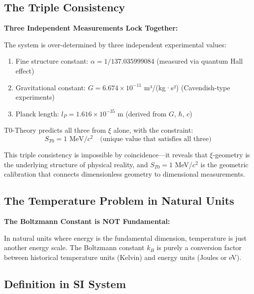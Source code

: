 \documentclass[12pt,a4paper]{article}
\begin{document}
	\subsection{The Triple Consistency}
	
	\begin{insight}
		\textbf{Three Independent Measurements Lock Together:}
		
		The system is over-determined by three independent experimental values:
		\begin{enumerate}
			\item Fine structure constant: $\alpha = 1/137.035999084$ (measured via quantum Hall effect)
			\item Gravitational constant: $G = 6.674 \times 10^{-11}$ m³/(kg·s²) (Cavendish-type experiments)
			\item Planck length: $l_P = 1.616 \times 10^{-35}$ m (derived from $G$, $\hbar$, $c$)
		\end{enumerate}
		
		T0-Theory predicts all three from $\xi$ alone, with the constraint:
		\begin{equation}
			S_{T0} = 1 \text{ MeV}/c^2 \quad \text{(unique value that satisfies all three)}
		\end{equation}
		
		This triple consistency is impossible by coincidence—it reveals that $\xi$-geometry is the underlying structure of physical reality, and $S_{T0} = 1$ MeV/$c^2$ is the geometric calibration that connects dimensionless geometry to dimensional measurements.
	\end{insight}
	
	\subsection{The Temperature Problem in Natural Units}
	
	\begin{warning}
		\textbf{The Boltzmann Constant is NOT Fundamental:}
		
		In natural units where energy is the fundamental dimension, temperature is just another energy scale. The Boltzmann constant $k_B$ is purely a conversion factor between historical temperature units (Kelvin) and energy units (Joules or eV).
	\end{warning}
	
	\subsection{Definition in SI System}
	
\end{document}
